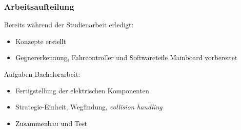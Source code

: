 \begin{frame}
	\frametitle{Arbeitsaufteilung}
	Bereits während der Studienarbeit erledigt:
	\begin{itemize}
		\item Konzepte erstellt
		\item Gegnererkennung, Fahrcontroller und Softwareteile Mainboard vorbereitet
	\end{itemize}
	\vspace{1em}
	Aufgaben Bachelorarbeit:
	\begin{itemize}
	   	\item Fertigstellung der elektrischen Komponenten
	   	\item Strategie-Einheit, Wegfindung, \textit{collision handling}
	   	\item Zusammenbau und Test
	\end{itemize}

\end{frame}
